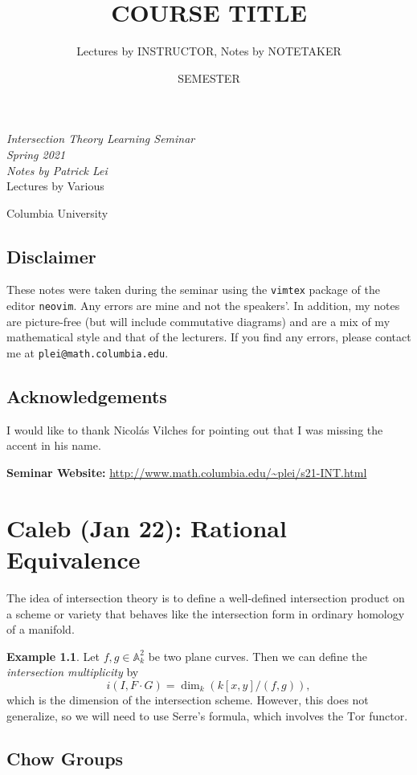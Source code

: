 \documentclass[leqno, openany]{memoir}
\title{COURSE TITLE}
\author{Lectures by INSTRUCTOR, Notes by NOTETAKER}
\date{SEMESTER}
\theoremstyle{definition}
\newtheorem{exm}[thm]{Example}
\theoremstyle{remark}
\theoremstyle{plain}
\theoremstyle{definition}
\theoremstyle{remark}
\newcommand{\A}{\mathbb{A}}
\newcommand{\mr}[1]{\mathrm{#1}}
\newcommand*{\titleSW}
    {\begingroup%
    \raggedleft
    \vspace*{\baselineskip}
    {\Huge\itshape Intersection Theory Learning Seminar \\ Spring 2021}\\[\baselineskip]
    {\large\itshape Notes by Patrick Lei}\\[0.2\textheight]
    {\Large Lectures by Various}\par
    \vfill
    {\Large \sffamily Columbia University}
    \vspace*{\baselineskip}
\endgroup}
\begin{document}
    
\begin{titlingpage}
\titleSW
\end{titlingpage}

\thispagestyle{empty}
\section*{Disclaimer}%
\label{sec:disclaimer}

These notes were taken during the seminar using the \texttt{vimtex} package of the editor \texttt{neovim}. 
Any errors are mine and not the speakers'. 
In addition, my notes are picture-free (but will include commutative diagrams) and are a mix of my mathematical style and that of the lecturers.
If you find any errors, please contact me at \texttt{plei@math.columbia.edu}.

\section*{Acknowledgements}%
\label{sec:acknowledgements}

I would like to thank Nicol\'as Vilches for pointing out that I was missing the accent in his name.

\vspace*{1cm}

\noindent\textbf{Seminar Website:}  \url{http://www.math.columbia.edu/~plei/s21-INT.html}
\newpage

\tableofcontents

\chapter{Caleb (Jan 22): Rational Equivalence}%
\label{cha:caleb_jan_22_rational_equivalence}

The idea of intersection theory is to define a well-defined intersection product on a scheme or variety that behaves like the intersection form in ordinary homology of a manifold.

\begin{exm}
    Let $f, g \in \A_k^2$ be two plane curves. Then we can define the \textit{intersection multiplicity} by
    \[ i(I, F \cdot G) = \dim_k (k[x,y] / (f,g)), \]
    which is the dimension of the intersection scheme. However, this does not generalize, so we will need to use Serre's formula, which involves the $\mr{Tor}$ functor.
\end{exm}

\section{Chow Groups}%
\label{sec:chow_groups}
\end{document}
